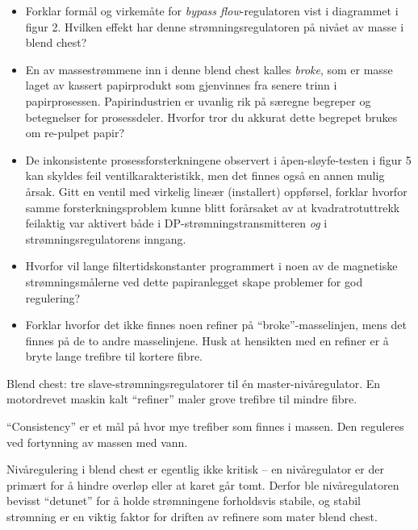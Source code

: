 \begin{itemize}
\item{} Forklar formål og virkemåte for {\it bypass flow}-regulatoren vist i diagrammet i figur 2. Hvilken effekt har denne strømningsregulatoren på nivået av masse i blend chest?
\item{} En av massestrømmene inn i denne blend chest kalles {\it broke}, som er masse laget av kassert papirprodukt som gjenvinnes fra senere trinn i papirprosessen. Papirindustrien er uvanlig rik på særegne begreper og betegnelser for prosessdeler. Hvorfor tror du akkurat dette begrepet brukes om re-pulpet papir?
\item{} De inkonsistente prosessforsterkningene observert i åpen-sløyfe-testen i figur 5 kan skyldes feil ventilkarakteristikk, men det finnes også en annen mulig årsak. Gitt en ventil med virkelig lineær (installert) oppførsel, forklar hvorfor samme forsterkningsproblem kunne blitt forårsaket av at kvadratrotuttrekk feilaktig var aktivert både i DP-strømningstransmitteren {\it og} i strømningsregulatorens inngang.
\item{} Hvorfor vil lange filtertidskonstanter programmert i noen av de magnetiske strømningsmålerne ved dette papiranlegget skape problemer for god regulering?
\item{} Forklar hvorfor det ikke finnes noen refiner på ``broke''-masselinjen, mens det finnes på de to andre masselinjene. Husk at hensikten med en refiner er å bryte lange trefibre til kortere fibre.
\end{itemize}














Blend chest: tre slave-strømningsregulatorer til én master-nivåregulator. En motordrevet maskin kalt ``refiner'' maler grove trefibre til mindre fibre.

\vskip 10pt

``Consistency'' er et mål på hvor mye trefiber som finnes i massen. Den reguleres ved fortynning av massen med vann.

\vskip 10pt

Nivåregulering i blend chest er egentlig ikke kritisk -- en nivåregulator er der primært for å hindre overløp eller at karet går tomt. Derfor ble nivåregulatoren bevisst ``detunet'' for å holde strømningene forholdsvis stabile, og stabil strømning er en viktig faktor for driften av refinere som mater blend chest.

